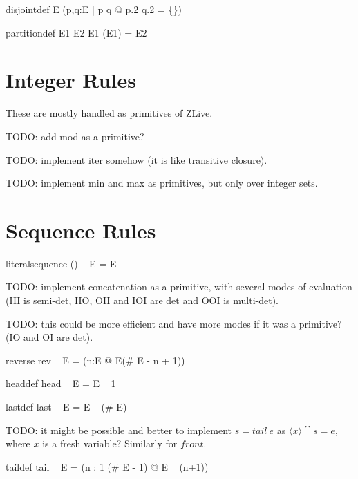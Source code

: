 \documentclass{article}
\begin{document}
\begin{zedrule}{disjointdef}
   \disjoint E \iff (\forall p,q:E | p \neq q @ p.2 \cap q.2 = \{\})
\end{zedrule}

\begin{zedrule}{partitiondef}
   E1 \partition E2 \iff \disjoint E1 \land \bigcup(\ran E1) = E2
\end{zedrule}


\section{Integer Rules}

These are mostly handled as primitives of ZLive.


TODO: add mod as a primitive?

TODO: implement iter somehow (it is like transitive closure).

TODO: implement min and max as primitives, but only over integer sets.


\section{Sequence Rules}

\begin{zedrule}{literalsequence}
   (\langle \listarg \rangle) ~ E = E
\end{zedrule}

TODO: implement concatenation as a primitive, with several
modes of evaluation (III is semi-det, IIO, OII and IOI are det
and OOI is multi-det).

TODO: this could be more efficient and have more modes if it
was a primitive? (IO and OI are det).
\begin{zedrule}{reverse}
   rev ~ E = (\lambda n:\dom E @ E(\# E - n + 1))
\end{zedrule}

\begin{zedrule}{headdef}
   head ~ E = E ~ 1
\end{zedrule}

\begin{zedrule}{lastdef}
   last ~ E = E ~ (\# E)
\end{zedrule}

TODO: it might be possible and better to implement $s=tail~e$
as $\langle x \rangle \cat s = e$, where $x$ is a fresh variable?
Similarly for $front$.
\begin{zedrule}{taildef}
   tail ~ E = (\lambda n : 1 \upto (\# E - 1) @ E ~ (n+1))
\end{zedrule}
\end{document}
